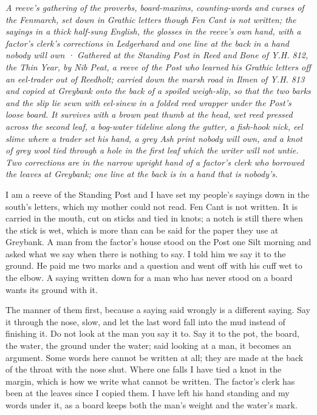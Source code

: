 \documentclass{design/chronicle}
\begin{document}
\clearpage{}
{\centering\FellFont\itshape\footnotesize\color{faded} A reeve’s gathering of the proverbs, board-maxims, counting-words and curses of the Fenmarch, set down in Grathic letters though Fen Cant is not written; the sayings in a thick half-sung English, the glosses in the reeve’s own hand, with a factor’s clerk’s corrections in Ledgerhand and one line at the back in a hand nobody will own · Gathered at the Standing Post in Reed and Bone of Y.H. 812, the Thin Year, by Nib Peat, a reeve of the Post who learned his Grathic letters off an eel-trader out of Reedholt; carried down the marsh road in Ilmen of Y.H. 813 and copied at Greybank onto the back of a spoiled weigh-slip, so that the two barks and the slip lie sewn with eel-sinew in a folded reed wrapper under the Post’s loose board. It survives with a brown peat thumb at the head, wet reed pressed across the second leaf, a bog-water tideline along the gutter, a fish-hook nick, eel slime where a trader set his hand, a grey Ash print nobody will own, and a knot of grey wool tied through a hole in the first leaf which the writer will not untie. Two corrections are in the narrow upright hand of a factor’s clerk who borrowed the leaves at Greybank; one line at the back is in a hand that is nobody’s.\par}\medskip
I am a reeve of the Standing Post and I have set my people’s sayings down in the south’s letters, which my mother could not read. Fen Cant is not written. It is carried in the mouth, cut on sticks and tied in knots; a notch is still there when the stick is wet, which is more than can be said for the paper they use at Greybank. A man from the factor’s house stood on the Post one Silt morning and asked what we say when there is nothing to say. I told him we say it to the ground. He paid me two marks and a question and went off with his cuff wet to the elbow. A saying written down for a man who has never stood on a board wants its ground with it.

The manner of them first, because a saying said wrongly is a different saying. Say it through the nose, slow, and let the last word fall into the mud instead of finishing it. Do not look at the man you say it to. Say it to the pot, the board, the water, the ground under the water; said looking at a man, it becomes an argument. Some words here cannot be written at all; they are made at the back of the throat with the nose shut. Where one falls I have tied a knot in the margin, which is how we write what cannot be written. The factor’s clerk has been at the leaves since I copied them. I have left his hand standing and my words under it, as a board keeps both the man’s weight and the water’s mark.
\end{document}
